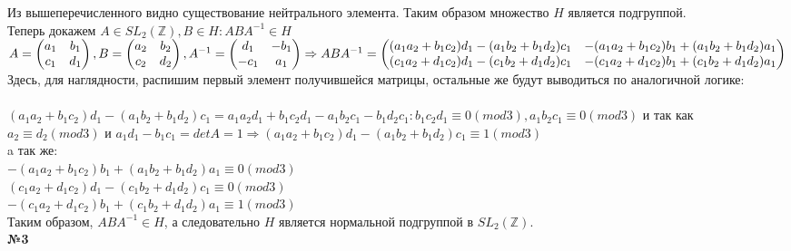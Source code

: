 \documentclass[a4paper, 12pt]{article}
\begin{document}
	 Из вышеперечисленного видно существование нейтрального элемента. Таким образом множество $H$ является подгруппой. \\
	 
	 Теперь докажем $A \in SL_2(\mathbb Z), B \in H: ABA^{-1} \in H$ \\
	 $A = \begin{pmatrix}
	 	a_1 & b_1 \\
	 	c_1 & d_1 
	 \end{pmatrix}, B = \begin{pmatrix}
	 	a_2 & b_2 \\
	 	c_2 & d_2 
	 \end{pmatrix}, A^{-1} = \begin{pmatrix}
	 d_1 & -b_1 \\
	 -c_1 & a_1 
	 \end{pmatrix} \Rightarrow \\ ABA^{-1} = \begin{pmatrix}
	 (a_1a_2 + b_1c_2)d_1 - (a_1b_2+ b_1d_2)c_1 & -(a_1a_2 + b_1c_2)b_1 + (a_1b_2+ b_1d_2)a_1 \\
	 (c_1a_2 + d _1c_2)d_1 - (c_1b_2 + d_1d_2)c_1 & -(c_1a_2 + d _1c_2)b_1 + (c_1b_2 + d_1d_2)a_1
	 \end{pmatrix}$ \\
	
	Здесь, для наглядности, распишим первый элемент получившейся матрицы, остальные же будут выводиться по аналогичной логике: \\\\
	$(a_1a_2 + b_1c_2)d_1 - (a_1b_2+ b_1d_2)c_1 = a_1a_2d_1 + b_1c_2d_1 - a_1b_2c_1 - b_1d_2c_1 :
	b_1c_2d_1 \equiv 0 (mod 3), a_1b_2c_1 \equiv 0 (mod 3)$ и так как $a_2 \equiv d_2 (mod 3)$ и $a_1d_1 - b_1c_1 = detA = 1 \Rightarrow (a_1a_2 + b_1c_2)d_1 - (a_1b_2+ b_1d_2)c_1 \equiv 1 (mod 3)$ \\ a так же: \\
	$-(a_1a_2 + b_1c_2)b_1 + (a_1b_2+ b_1d_2)a_1 \equiv 0 (mod 3)$ \\
	$(c_1a_2 + d _1c_2)d_1 - (c_1b_2 + d_1d_2)c_1 \equiv 0 (mod 3)$ \\
	$-(c_1a_2 + d _1c_2)b_1 + (c_1b_2 + d_1d_2)a_1 \equiv 1 (mod 3)$ \\
	
	Таким образом, $ABA^{-1} \in H$, а следовательно $H$ является нормальной подгруппой в $SL_2(\mathbb Z)$. \\
	
	\textbf{№3} \\
	
\end{document}
